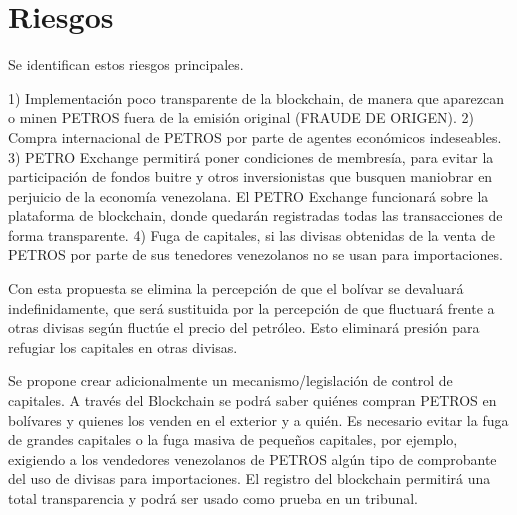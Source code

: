 %
\section{Riesgos}
\label{sec:riesgo}
%
Se identifican estos riesgos principales.

    1) Implementación poco transparente de la blockchain, de manera que aparezcan o minen PETROS fuera de la emisión original (FRAUDE DE ORIGEN).
    2) Compra internacional de PETROS por parte de agentes económicos indeseables.
    3) PETRO Exchange permitirá poner condiciones de membresía, para evitar la participación de fondos buitre y otros inversionistas que busquen maniobrar en perjuicio de la economía venezolana. El PETRO Exchange funcionará sobre la plataforma de blockchain, donde quedarán registradas todas las transacciones de forma transparente.
    4) Fuga de capitales, si las divisas obtenidas de la venta de PETROS por parte de sus tenedores venezolanos no se usan para importaciones.

Con esta propuesta se elimina la percepción de que el bolívar se devaluará indefinidamente, que será sustituida por la percepción de que fluctuará frente a otras divisas según fluctúe el precio del petróleo. Esto eliminará presión para refugiar los capitales en otras divisas.

Se propone crear adicionalmente un mecanismo/legislación de control de capitales. A través del Blockchain se podrá saber quiénes compran PETROS en bolívares y quienes los venden en el exterior y a quién. Es necesario evitar la fuga de grandes capitales o la fuga masiva de pequeños capitales, por ejemplo, exigiendo a los vendedores venezolanos de PETROS algún tipo de comprobante del uso de divisas para importaciones. El registro del blockchain permitirá una total transparencia y podrá ser usado como prueba en un tribunal.